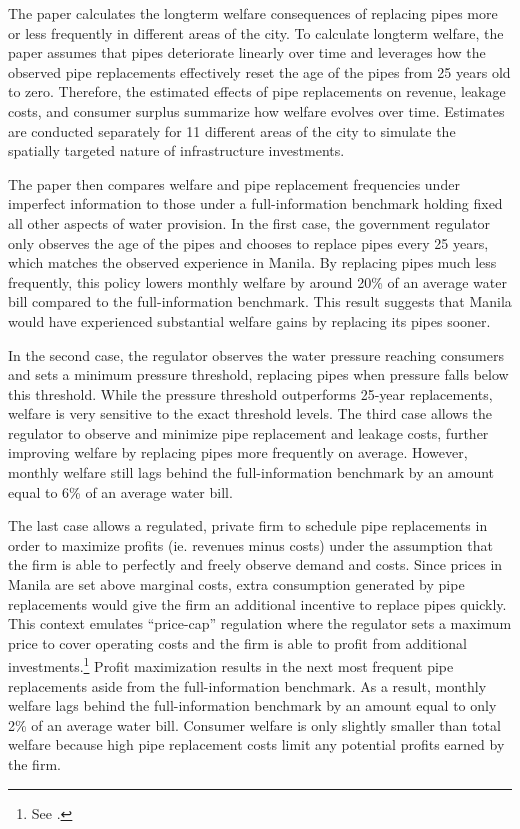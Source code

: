 \documentclass[12pt,table]{article}
\begin{document}
The paper calculates the longterm welfare consequences of replacing pipes more or less frequently in different areas of the city.  To calculate longterm welfare, the paper assumes that pipes deteriorate linearly over time and leverages how the observed pipe replacements effectively reset the age of the pipes from 25 years old to zero.  Therefore, the estimated effects of pipe replacements on revenue, leakage costs, and consumer surplus summarize how welfare evolves over time.  Estimates are conducted separately for 11 different areas of the city to simulate the spatially targeted nature of infrastructure investments.  %

The paper then compares welfare and pipe replacement frequencies under imperfect information to those under a full-information benchmark holding fixed all other aspects of water provision.  In the first case, the government regulator only observes the age of the pipes and chooses to replace pipes every 25 years, which matches the observed experience in Manila.  By replacing pipes much less frequently, this policy lowers monthly welfare by around 20\% of an average water bill compared to the full-information benchmark.  This result suggests that Manila would have experienced substantial welfare gains by replacing its pipes sooner.

In the second case, the regulator observes the water pressure reaching consumers and sets a minimum pressure threshold, replacing pipes when pressure falls below this threshold.  While the pressure threshold outperforms 25-year replacements, welfare is very sensitive to the exact threshold levels.  The third case allows the regulator to observe and minimize pipe replacement and leakage costs, further improving welfare by replacing pipes more frequently on average.  However, monthly welfare still lags behind the full-information benchmark by an amount equal to 6\% of an average water bill.

The last case allows a regulated, private firm to schedule pipe replacements in order to maximize profits (ie. revenues minus costs) under the assumption that the firm is able to perfectly and freely observe demand and costs.  Since prices in Manila are set above marginal costs, extra consumption generated by pipe replacements would give the firm an additional incentive to replace pipes quickly.  This context emulates ``price-cap'' regulation where the regulator sets a maximum price to cover operating costs and the firm is able to profit from additional investments.\footnote{See \cite{joskow2007regulation}.}  Profit maximization results in the next most frequent pipe replacements aside from the full-information benchmark.  As a result, monthly welfare lags behind the full-information benchmark by an amount equal to only 2\% of an average water bill.  Consumer welfare is only slightly smaller than total welfare because high pipe replacement costs limit any potential profits earned by the firm.
\end{document}
